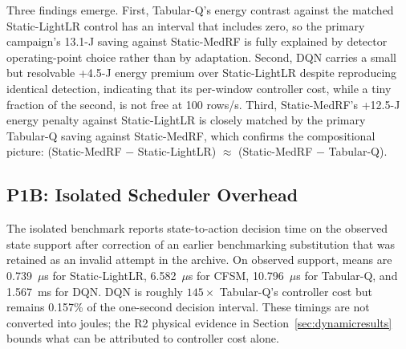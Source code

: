 \begin{table}[t]
\centering\footnotesize
\caption{P1A paired contrasts, ten trace-matched blocks. $\Delta E$ is first-minus-second method; the sign-flip $p$ column is an exact non-parametric diagnostic over the ten block-level differences.}
\label{tab:p1a}
\setlength{\tabcolsep}{3.0pt}
\end{table}

Three findings emerge. First, Tabular-Q's energy contrast against the matched Static-LightLR control has an interval that includes zero, so the primary campaign's 13.1-J saving against Static-MedRF is fully explained by detector operating-point choice rather than by adaptation. Second, DQN carries a small but resolvable +4.5-J energy premium over Static-LightLR despite reproducing identical detection, indicating that its per-window controller cost, while a tiny fraction of the second, is not free at 100 rows/s. Third, Static-MedRF's +12.5-J energy penalty against Static-LightLR is closely matched by the primary Tabular-Q saving against Static-MedRF, which confirms the compositional picture: (Static-MedRF $-$ Static-LightLR) $\approx$ (Static-MedRF $-$ Tabular-Q).

\subsection{P1B: Isolated Scheduler Overhead}
The isolated benchmark reports state-to-action decision time on the observed state support after correction of an earlier benchmarking substitution that was retained as an invalid attempt in the archive. On observed support, means are 0.739~$\mu$s for Static-LightLR, 6.582~$\mu$s for CFSM, 10.796~$\mu$s for Tabular-Q, and 1.567~ms for DQN. DQN is roughly $145\times$ Tabular-Q's controller cost but remains 0.157\% of the one-second decision interval. These timings are not converted into joules; the R2 physical evidence in Section~\ref{sec:dynamicresults} bounds what can be attributed to controller cost alone.

